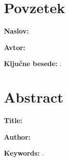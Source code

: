 \pagestyle{empty}
\def\thepage{}%
\tableofcontents{}

\clearemptydoublepage

\chapter*{Povzetek}

\noindent\textbf{Naslov:} \ttitle
\bigskip

\noindent\textbf{Avtor:} \tauthor
\bigskip

\noindent \tpovzetek

\bigskip

\noindent\textbf{Ključne besede:} \tkeywords.
\clearemptydoublepage

\chapter*{Abstract}

\noindent\textbf{Title:} \ttitleEn
\bigskip

\noindent\textbf{Author:} \tauthor
\bigskip

\noindent \tabstract
\bigskip

\noindent\textbf{Keywords:} \tkeywordsEn.
\clearemptydoublepage